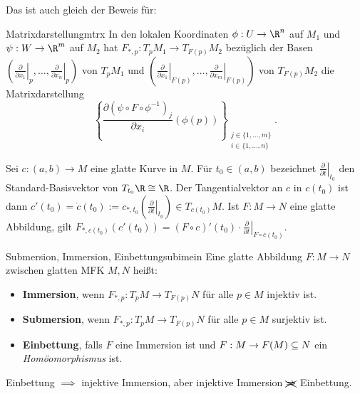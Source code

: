 Das ist auch gleich der Beweis für:
\begin{satz}{Matrixdarstellung}{mtrx}
In den lokalen Koordinaten $\phi: U \to \R^n$ auf $M_1$ und $\psi: W \to \R^m$ auf $M_2$ hat $F_{\ast, p}: T_pM_1 \to T_{F(p)}M_2$ bezüglich der Basen $\left( \left.\frac{\partial}{\partial x_1}\right|_p, \dots, \left.\frac{\partial}{\partial x_n}\right|_p \right)$ von $T_pM_1$ und $\left( \left.\frac{\partial}{\partial x_1}\right|_{F(p)}, \dots, \left.\frac{\partial}{\partial x_m}\right|_{F(p)} \right)$ von $T_{F(p)}M_2$ die Matrixdarstellung
\begin{equation}
\left\{ \frac{\partial (\psi \circ F \circ \phi^{-1})_j}{\partial x_i} (\phi(p))\right\}_{\substack{j \in \{1, \dots, m\}\\i \in \{ 1, \dots, n\}}}.
\end{equation}
\end{satz}
\begin{beispiel}
Sei $c: (a,b) \to M$ eine glatte Kurve in $M$. Für $t_0 \in (a,b)$ bezeichnet $\left.\frac{\partial}{\partial t}\right|_{t_0}$ den Standard-Basisvektor von $T_{t_0}\R \cong \R$. Der Tangentialvektor an $c$ in $c(t_0)$ ist dann $c'(t_0)=\dot{c}(t_0):= c_{\ast, t_0}\left(\left.\frac{\partial}{\partial t}\right|_{t_0} \right) \in T_{c(t_0)}M$. Ist $F: M \to N$ eine glatte Abbildung, gilt $F_{\ast, c(t_0)} (c'(t_0)) = (F \circ c)'(t_0) \cdot \left.\frac{\partial}{\partial t}\right|_{F \circ c(t_0)}$.
\end{beispiel}
\begin{definition}{Submersion, Immersion, Einbettung}{subimein}
Eine glatte Abbildung $F: M \to N$ zwischen glatten MFK $M, N$ heißt:
\begin{itemize}
\item \textbf{Immersion}, wenn $F_{\ast, p}: T_pM \to T_{F(p)}N$ für alle $p \in M$ injektiv ist.
\item \textbf{Submersion}, wenn $F_{\ast, p}: T_pM \to T_{F(p)}N$ für alle $p \in M$ surjektiv ist.
\item \textbf{Einbettung}, falls $F$ eine Immersion ist und $F: M \to F(M) \subseteq N$ ein \textit{Homöomorphismus} ist.
\end{itemize}
\end{definition}
\begin{bemerkung}
Einbettung $\implies$ injektive Immersion, aber injektive Immersion $\xcancel{\implies}$ Einbettung.
\end{bemerkung}
